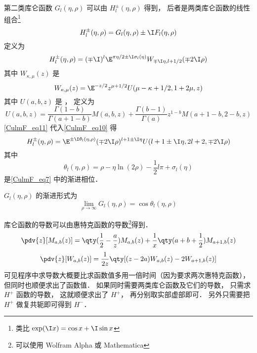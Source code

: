 第二类库仑函数 $G_l(\eta, \rho)$ 可以由 $H_l^\pm(\eta, \rho)$ 得到， 后者是两类库仑函数的线性组合\footnote{类比 $\exp(\I x) = \cos x + \I\sin x$}
\begin{equation}
H_l^\pm(\eta, \rho) = G_l(\eta, \rho) \pm \I F_l(\eta, \rho)
\end{equation}	
定义为
\begin{equation}\label{CulmF_eq10}
H_l^\pm(\eta, \rho) = (\mp\I)^l \E^{\pi\eta/2 \pm \I \sigma_l(\eta)} W_{\mp\I\eta, l + 1/2}(\mp 2\I\rho)
\end{equation}
其中 $W_{\kappa, \mu}(z)$ 是
\begin{equation}\label{CulmF_eq11}
W_{\kappa, \mu}(z) = \E^{-z/2} z^{\mu + 1/2} U(\mu - \kappa + 1/2, 1 + 2\mu, z)
\end{equation}
其中 $U(a, b, z)$ 是 ， 定义为
\begin{equation}
U(a, b, z) = \frac{\Gamma(1 - b)}{\Gamma(a + 1 - b)} M(a, b, z) + \frac{\Gamma(b - 1)}{\Gamma(a)} z^{1 - b} M(a + 1 - b, 2 - b, z)
\end{equation}
\autoref{CulmF_eq11} 代入\autoref{CulmF_eq10} 得
\begin{equation}
H_l^\pm(\eta, \rho) = \E^{\pm\I\theta_l(\eta, \rho)}(\mp 2\I\rho)^{l + 1 \pm\I\eta} U(l + 1 \pm \I\eta, 2l + 2, \mp2\I\rho)
\end{equation}
其中
\begin{equation}
\theta_l(\eta, \rho) = \rho - \eta\ln(2\rho) - \frac12 l\pi + \sigma_l(\eta)
\end{equation}
是\autoref{CulmF_eq7} 中的渐进相位．

$G_l(\eta,\rho)$ 的渐进形式为
\begin{equation}
\lim_{\rho\to \infty} G_l(\eta, \rho) = \cos\theta_l(\eta, \rho)
\end{equation}

库仑函数的导数可以由惠特克函数的导数\footnote{可以使用 Wolfram Alpha 或 Mathematica}得到．
\begin{equation}
\pdv{z} [M_{a, b}(z)] = \qty(\frac12 - \frac{a}{z}) M_{a, b}(z) + \frac{1}{x} \qty(a + b + \frac12) M_{a+1, b}(z)
\end{equation}
\begin{equation}
\pdv{z} [W_{a, b}(z)] = \frac{1}{2z} \qty[(z - 2a) W_{a, b}(z) - 2W_{a+1, b}(z)]
\end{equation}
可见程序中求导数大概要比求函数值多用一倍时间（因为要求两次惠特克函数）， 但同时也顺便求出了函数值． 如果同时需要两类库仑函数及它们的导数， 只需求 $H^+$ 函数的导数， 这就顺便求出了 $H^+$， 再分别取实部虚部即可． 另外只需要把 $H^+$ 做复共轭即可得到 $H^-$．

